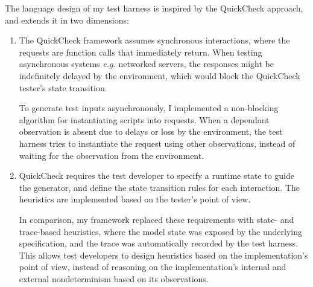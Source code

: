 The language design of my test harness is inspired by the QuickCheck approach,
and extends it in two dimensions:
\begin{enumerate}
\item The QuickCheck framework assumes synchronous interactions, where the
  requests are function calls that immediately return.  When testing
  asynchronous systems {\it e.g.} networked servers, the responses might be
  indefinitely delayed by the environment, which would block the QuickCheck
  tester's state transition.
  
  To generate test inputs asynchronously, I implemented a non-blocking algorithm
  for instantiating scripts into requests.  When a dependant observation is
  absent due to delays or loss by the environment, the test harness tries to
  instantiate the request using other observations, instead of waiting for the
  observation from the environment.

\item QuickCheck requires the test developer to specify a runtime state to guide
  the generator, and define the state transition rules for each interaction.
  The heuristics are implemented based on the tester's point of view.

  In comparison, my framework replaced these requirements with state- and
  trace-based heuristics, where the model state was exposed by the underlying
  specification, and the trace was automatically recorded by the test harness.
  This allows test developers to design heuristics based on the implementation's
  point of view, instead of reasoning on the implementation's internal and
  external nondeterminism based on its observations.
\end{enumerate}
